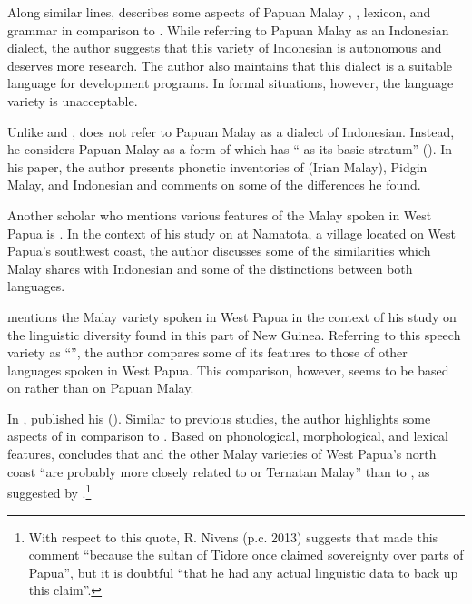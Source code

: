 {Along similar lines, \citet{Suharno.1979, Suharno.1981} describes some aspects of Papuan Malay , , lexicon, and grammar in comparison to . While referring to Papuan Malay as an Indonesian dialect, the author suggests that this variety of Indonesian is autonomous and deserves more research. The author also maintains that this dialect is a suitable language for development programs. In formal situations, however, the language variety is unacceptable.



Unlike \citet{Samaun.1979} and \citet{Suharno.1979, Suharno.1981}, \citet{Roosman.1982} does not refer to Papuan Malay as a dialect of Indonesian. Instead, he considers Papuan Malay as a form of  which has  `` as its basic stratum'' (\citeyear*[1]{Roosman.1982}). In his paper, the author presents phonetic inventories of  (Irian Malay), Pidgin Malay, and Indonesian and comments on some of the differences he found.



Another scholar who mentions various features of the Malay spoken in West Papua is \citet{Walker.1982}. In the context of his study on  at Namatota, a village located on West Papua’s southwest coast, the author discusses some of the similarities which Malay shares with Indonesian and some of the distinctions between both languages.



\citet{Ajamiseba.1984} mentions the Malay variety spoken in West Papua in the context of his study on the linguistic diversity found in this part of New Guinea. Referring to this speech variety as ``'', the author compares some of its features to those of other languages spoken in West Papua. This comparison, however, seems to be based on  rather than on Papuan Malay.



In  \citeyear*{vanVelzen.1995}, \citeauthor{vanVelzen.1995} published his   (\citeyear*{vanVelzen.1995}). Similar to previous studies, the author highlights some aspects of  in comparison to . Based on phonological, morphological, and lexical features, \citet[315]{vanVelzen.1995} concludes that  and the other Malay varieties of West Papua’s north coast  ``are probably more closely related to  or Ternatan Malay'' than to , as suggested by \citet{Roosman.1982}.\footnote{With respect to this quote, R. Nivens (p.c. 2013) suggests that \citet[315]{vanVelzen.1995} made this comment  ``because the sultan of Tidore once claimed sovereignty over parts of Papua'', but it is doubtful  ``that he had any actual linguistic data to back up this claim''.}


}
